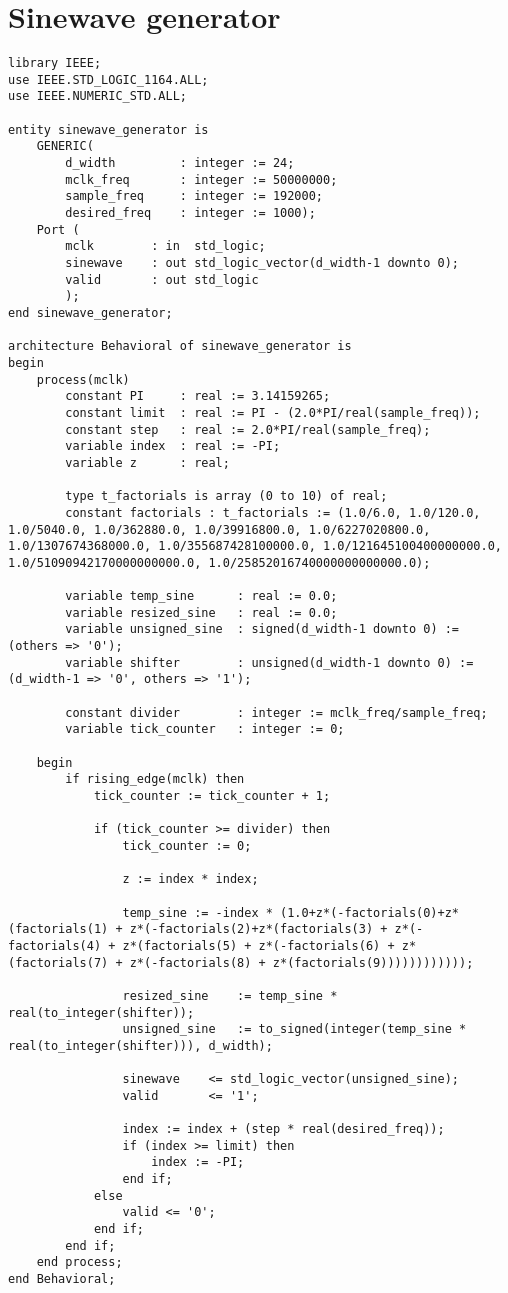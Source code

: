 \section*{Sinewave generator}
\begin{lstlisting}
library IEEE;
use IEEE.STD_LOGIC_1164.ALL;
use IEEE.NUMERIC_STD.ALL;

entity sinewave_generator is
    GENERIC(
        d_width         : integer := 24;
        mclk_freq       : integer := 50000000;
        sample_freq     : integer := 192000;
        desired_freq    : integer := 1000);
    Port (
        mclk        : in  std_logic;
        sinewave    : out std_logic_vector(d_width-1 downto 0);
        valid       : out std_logic
        ); 
end sinewave_generator;

architecture Behavioral of sinewave_generator is
begin
    process(mclk)
        constant PI     : real := 3.14159265;
        constant limit  : real := PI - (2.0*PI/real(sample_freq));
        constant step   : real := 2.0*PI/real(sample_freq);
        variable index  : real := -PI;
        variable z      : real;

        type t_factorials is array (0 to 10) of real;
        constant factorials : t_factorials := (1.0/6.0, 1.0/120.0, 1.0/5040.0, 1.0/362880.0, 1.0/39916800.0, 1.0/6227020800.0, 1.0/1307674368000.0, 1.0/355687428100000.0, 1.0/121645100400000000.0, 1.0/51090942170000000000.0, 1.0/25852016740000000000000.0);

        variable temp_sine      : real := 0.0;
        variable resized_sine   : real := 0.0;
        variable unsigned_sine  : signed(d_width-1 downto 0) := (others => '0');
        variable shifter        : unsigned(d_width-1 downto 0) := (d_width-1 => '0', others => '1');

        constant divider        : integer := mclk_freq/sample_freq;
        variable tick_counter   : integer := 0;

    begin
        if rising_edge(mclk) then
            tick_counter := tick_counter + 1;

            if (tick_counter >= divider) then
                tick_counter := 0;

                z := index * index;

                temp_sine := -index * (1.0+z*(-factorials(0)+z*(factorials(1) + z*(-factorials(2)+z*(factorials(3) + z*(-factorials(4) + z*(factorials(5) + z*(-factorials(6) + z*(factorials(7) + z*(-factorials(8) + z*(factorials(9))))))))))));

                resized_sine    := temp_sine * real(to_integer(shifter));
                unsigned_sine   := to_signed(integer(temp_sine * real(to_integer(shifter))), d_width);

                sinewave    <= std_logic_vector(unsigned_sine);
                valid       <= '1';

                index := index + (step * real(desired_freq));
                if (index >= limit) then
                    index := -PI;
                end if;
            else
                valid <= '0';
            end if;
        end if;
    end process;
end Behavioral;
\end{lstlisting}

